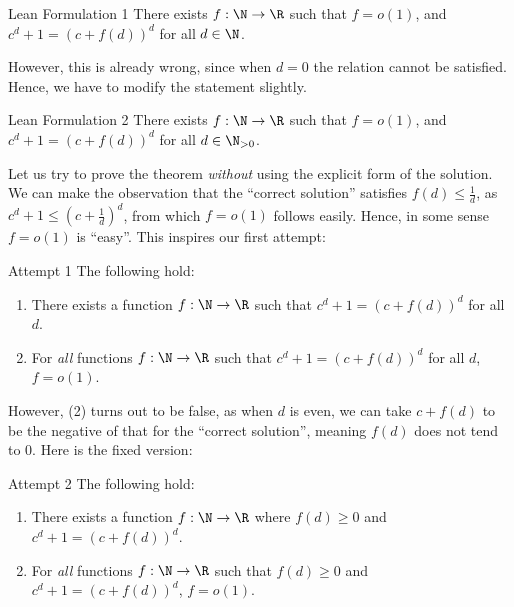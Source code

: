 \documentclass{article}[11px]
\begin{document}
\begin{theorem}{Lean Formulation 1}{}\label{thm:3.1}
There exists \(f : \N \to \R\) such that \(f = o(1)\), and \(c^d + 1 = (c + f(d))^d\) for all \(d \in \N\).
\end{theorem}

However, this is already wrong, since when \(d = 0\) the relation cannot be satisfied. Hence, we have to modify the statement slightly.

\begin{theorem}{Lean Formulation 2}{}
There exists \(f : \N \to \R\) such that \(f = o(1)\), and \(c^d + 1 = (c + f(d))^d\) for all \(d \in \N_{> 0}\).
\end{theorem}

Let us try to prove the theorem \textit{without} using the explicit form of the solution. We can make the observation that the ``correct solution'' satisfies \(f(d) \leq \frac{1}{d}\), as \(c^d + 1 \leq \left(c + \frac{1}{d}\right)^d\), from which \(f = o(1)\) follows easily. Hence, in some sense \(f = o(1)\) is ``easy''. This inspires our first attempt:

\begin{theorem}{Attempt 1}{}
The following hold:
\begin{enumerate}[(1)]
  \item There exists a function \(f : \N \to \R\) such that \(c^d + 1 = (c + f(d))^d\) for all \(d\).
  \item For \textit{all} functions \(f : \N \to \R\) such that \(c^d + 1 = (c + f(d))^d\) for all \(d\), \(f = o(1)\).
\end{enumerate}
\end{theorem}

However, (2) turns out to be false, as when \(d\) is even, we can take \(c + f(d)\) to be the negative of that for the ``correct solution'', meaning \(f(d)\) does not tend to \(0\). Here is the fixed version:

\begin{theorem}{\ok Attempt 2}{}
The following hold:
\begin{enumerate}[(1)]
  \item There exists a function \(f : \N \to \R\) where \(f(d) \geq 0\) and \(c^d + 1 = (c + f(d))^d\).
  \item For \textit{all} functions \(f : \N \to \R\) such that \(f(d) \geq 0\) and \(c^d + 1 = (c + f(d))^d\), \(f = o(1)\).
\end{enumerate}
\end{theorem}
\end{document}
